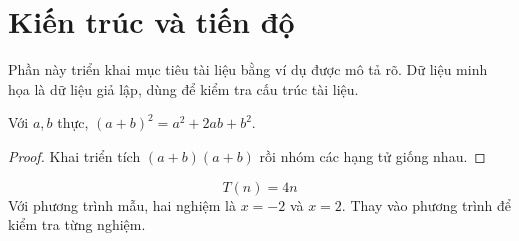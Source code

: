\chapter{Kiến trúc và tiến độ}


\label{sec:chapter2}
Phần này triển khai mục tiêu tài liệu bằng ví dụ được mô tả rõ. Dữ liệu minh họa là dữ liệu giả lập, dùng để kiểm tra cấu trúc tài liệu.

\begin{demotheorem}
Với $a,b$ thực, $(a+b)^2=a^2+2ab+b^2$.
\end{demotheorem}
\begin{proof}
Khai triển tích $(a+b)(a+b)$ rồi nhóm các hạng tử giống nhau.
\end{proof}
\[T(n)=4n\]
Với phương trình mẫu, hai nghiệm là $x=-2$ và $x=2$. Thay vào phương trình để kiểm tra từng nghiệm.
